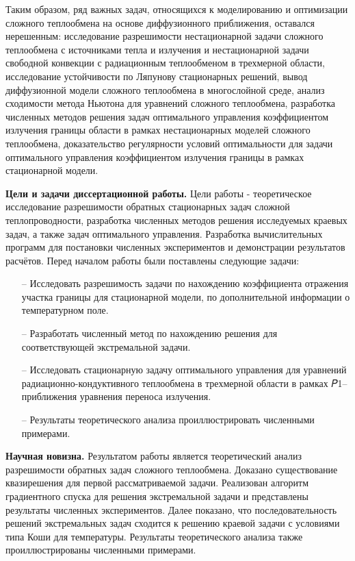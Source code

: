 Таким образом, ряд важных задач, относящихся к моделированию и оптимизации сложного теплообмена на основе
диффузионного приближения, оставался нерешенным: исследование разрешимости нестационарной задачи сложного
теплообмена с источниками тепла и излучения и нестационарной задачи свободной конвекции с радиационным
теплообменом в трехмерной области, исследование устойчивости по Ляпунову стационарных решений,
вывод диффузионной модели сложного теплообмена в многослойной среде, анализ сходимости метода Ньютона
для уравнений сложного теплообмена, разработка численных методов решения задач оптимального управления
коэффициентом излучения границы области в рамках нестационарных
моделей сложного теплообмена, доказательство регулярности условий оптимальности для задачи
оптимального управления коэффициентом излучения границы в рамках стационарной модели.


\textbf{Цели и задачи диссертационной работы.}
Цели работы - теоретическое исследование разрешимости обратных стационарных задач сложной теплопроводности,
разработка численных методов решения исследуемых краевых задач, а также задач оптимального управления.
Разработка вычислительных программ для постановки численных экспериментов и демонстрации результатов расчётов.
Перед началом работы были поставлены следующие задачи:
\begin{itemize}
  \item[--] Исследовать разрешимость задачи по нахождению коэффициента отражения участка границы для
  стационарной модели, по дополнительной информации о температурном поле.
  \item[--] Разработать численный метод по нахождению решения для соответствующей экстремальной задачи.
  \item[--] Исследовать стационарную задачу оптимального управления для уравнений радиационно-кондуктивного
  теплообмена в трехмерной области в рамках 𝑃1–приближения уравнения переноса излучения.
  \item[--] Результаты теоретического анализа проиллюстрировать численными примерами.
\end{itemize}


\textbf{Научная новизна.}
Результатом работы является теоретический анализ
разрешимости обратных задач сложного теплообмена.
Доказано существование квазирешения для первой рассматриваемой задачи.
Реализован алгоритм градиентного спуска для решения экстремальной задачи и представлены результаты
численных экспериментов.
Далее показано, что последовательность решений экстремальных задач сходится к решению
краевой задачи с условиями типа Коши для температуры.
Результаты теоретического анализа также проиллюстрированы численными примерами.

